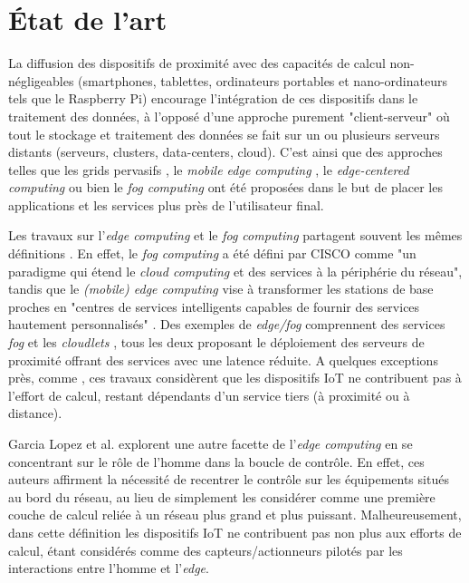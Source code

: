 \section{État de l'art}

La diffusion des dispositifs de proximité avec des capacités de calcul non-négligeables (smartphones, tablettes, ordinateurs portables et nano-ordinateurs tels que le Raspberry Pi) encourage l'intégration de ces dispositifs dans le traitement des données, à l'opposé d'une approche purement "client-serveur" où tout le stockage et traitement des données se fait sur un ou plusieurs serveurs distants (serveurs, clusters, data-centers, cloud). C'est ainsi que des approches telles que les grids pervasifs \cite{Parashar2010}, le \textit{mobile edge computing} \cite {Dey2013,MEC,Satyanarayanan09}, le \textit{edge-centered computing} \cite{Lopez2015} ou bien le \textit{fog computing} \cite{Bonomi2012} ont été proposées dans le but de placer les applications et les services plus près de l'utilisateur final.

Les travaux sur l'\textit{edge computing} et le \textit{fog computing} partagent souvent les mêmes définitions \cite{Vermesan}. En effet, le \textit{fog computing} a été défini par CISCO \cite{FogCISCO} comme "un paradigme qui étend le \textit{cloud computing} et des services à la périphérie du réseau", tandis que le \textit{(mobile) edge computing} vise à transformer les stations de base proches en "centres de services intelligents capables de fournir des services hautement personnalisés" \cite{Vermesan}. Des exemples de \textit{edge/fog} comprennent des services \textit{fog} \cite{Bonomi2012} et les \textit{cloudlets} \cite{Satyanarayanan09}, tous les deux proposant le déploiement des serveurs de proximité offrant des services avec une latence réduite. A quelques exceptions près, comme \cite{Dey2013}, ces travaux considèrent que les dispositifs IoT ne contribuent pas à l'effort de calcul, restant dépendants d'un service tiers (à proximité ou à distance).

Garcia Lopez et al. \cite{Lopez2015} explorent une autre facette de l'\textit{edge computing} en se concentrant sur le rôle de l'homme dans la boucle de contrôle. En effet, ces auteurs affirment la nécessité de recentrer le contrôle sur les équipements situés au bord du réseau, au lieu de simplement les considérer comme une première couche de calcul reliée à un réseau plus grand et plus puissant. %
Malheureusement, dans cette définition les dispositifs IoT ne contribuent pas non plus aux efforts de calcul, étant considérés comme des capteurs/actionneurs pilotés par les interactions entre l'homme et l'\textit{edge}.

